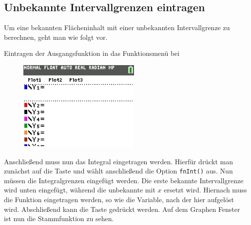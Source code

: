 \subsection{Unbekannte Intervallgrenzen eintragen}\label{sec:Unbekannte Intervallgrenze eintragen}
Um eine bekannten Flächeninhalt mit einer unbekannten Intervallgrenze zu berechnen, geht man wie folgt vor.
\begin{paracol}{2}
\begin{flushleft}
	Eintragen der Ausgangsfunktion in das Funktionsmenü bei 
\end{flushleft}	
\switchcolumn
\begin{flushright}
\begin{figure}
	\includegraphics[width=6cm]{Media/GRT/Visualisierung/unbekannte_intervallgrenze/unbekannte_intervallgrenze_1.png}
	\caption{}
\end{figure}
\end{flushright}
\end{paracol}
Anschließend muss nun das Integral eingetragen werden. Hierfür drückt man zunächst auf die Taste  und wählt anschließend die Option \texttt{fnInt()} aus. Nun müssen die Integralgrenzen eingefügt werden. Die erste bekannte Intervallgrenze wird unten eingefügt, während die unbekannte mit $x$ ersetzt wird. Hiernach muss die Funktion eingetragen werden, so wie die Variable, nach der hier aufgelöst wird. Abschließend kann die Taste  gedrückt werden. Auf dem Graphen Fenster ist nun die Stammfunktion zu sehen.
\pagebreak
